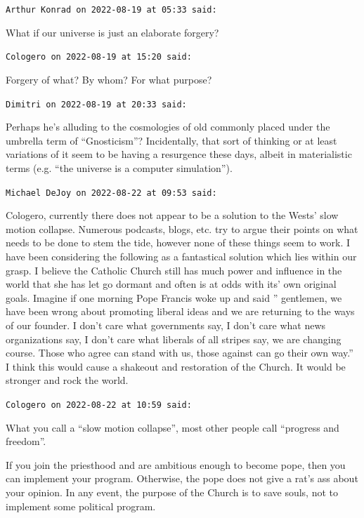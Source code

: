 \begin{footnotesize}
\begin{sffamily}
\texttt{Arthur Konrad on 2022-08-19 at 05:33 said:}

What if our universe is just an elaborate forgery?

\hfill

\texttt{Cologero on 2022-08-19 at 15:20 said:}

Forgery of what? By whom? For what purpose?

\hfill

\texttt{Dimitri on 2022-08-19 at 20:33 said:}

Perhaps he's alluding to the cosmologies of old commonly placed under the umbrella term of ``Gnosticism''? Incidentally, that sort of thinking or at least variations of it seem to be having a resurgence these days, albeit in materialistic terms (e.g. ``the universe is a computer simulation'').

\hfill

\texttt{Michael DeJoy on 2022-08-22 at 09:53 said:}

Cologero, currently there does not appear to be a solution to the Wests' slow motion collapse. Numerous podcasts, blogs, etc. try to argue their points on what needs to be done to stem the tide, however none of these things seem to work. I have been considering the following as a fantastical solution which lies within our grasp. I believe the Catholic Church still has much power and influence in the world that she has let go dormant and often is at odds with its' own original goals. Imagine if one morning Pope Francis woke up and said '' gentlemen, we have been wrong about promoting liberal ideas and we are returning to the ways of our founder. I don't care what governments say, I don't care what news organizations say, I don't care what liberals of all stripes say, we are changing course. Those who agree can stand with us, those against can go their own way.'' I think this would cause a shakeout and restoration of the Church. It would be stronger and rock the world.

\hfill

\texttt{Cologero on 2022-08-22 at 10:59 said:}

What you call a ``slow motion collapse'', most other people call ``progress and freedom''.

If you join the priesthood and are ambitious enough to become pope, then you can implement your program. Otherwise, the pope does not give a rat's ass about your opinion. In any event, the purpose of the Church is to save souls, not to implement some political program.


\end{sffamily}
\end{footnotesize}

